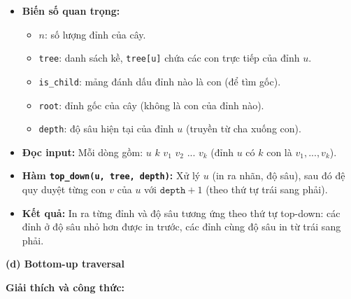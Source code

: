 \documentclass{article}
\begin{document}
\begin{itemize}
    \item \textbf{Biến số quan trọng:}
    \begin{itemize}
        \item $n$: số lượng đỉnh của cây.
        \item \texttt{tree}: danh sách kề, \texttt{tree[u]} chứa các con trực tiếp của đỉnh $u$.
        \item \texttt{is\_child}: mảng đánh dấu đỉnh nào là con (để tìm gốc).
        \item \texttt{root}: đỉnh gốc của cây (không là con của đỉnh nào).
        \item \texttt{depth}: độ sâu hiện tại của đỉnh $u$ (truyền từ cha xuống con).
    \end{itemize}
    \item \textbf{Đọc input:} Mỗi dòng gồm: $u$ $k$ $v_1$ $v_2$ ... $v_k$ (đỉnh $u$ có $k$ con là $v_1, ..., v_k$).
    \item \textbf{Hàm \texttt{top\_down(u, tree, depth)}:} Xử lý $u$ (in ra nhãn, độ sâu), sau đó đệ quy duyệt từng con $v$ của $u$ với $\texttt{depth}+1$ (theo thứ tự trái sang phải).
    \item \textbf{Kết quả:} In ra từng đỉnh và độ sâu tương ứng theo thứ tự top-down: các đỉnh ở độ sâu nhỏ hơn được in trước, các đỉnh cùng độ sâu in từ trái sang phải.
\end{itemize}



\textbf{(d) Bottom-up traversal}

\textbf{Giải thích và công thức:}
\end{document}
